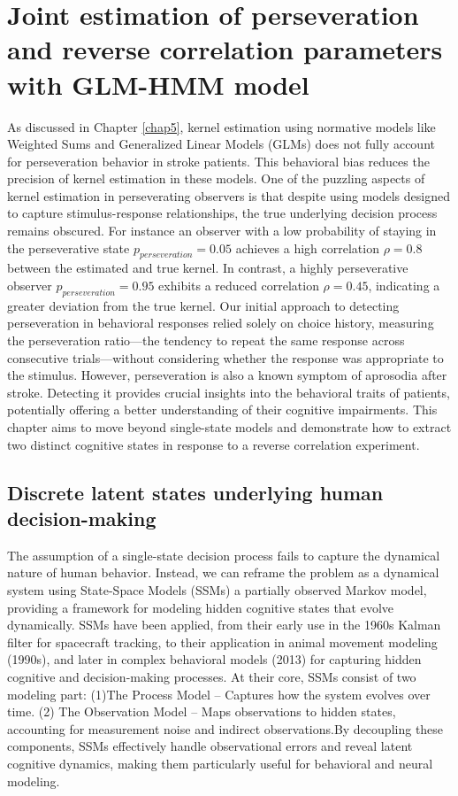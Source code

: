 \renewcommand{\chaptername}{Chapter} 
\chapter{Joint estimation of perseveration and reverse correlation parameters with GLM-HMM model}\label{chap7}
As discussed in Chapter \ref{chap5}, kernel estimation using normative models like Weighted Sums and Generalized Linear Models (GLMs) does not fully account for perseveration behavior in stroke patients. This behavioral bias reduces the precision of kernel estimation in these models. 
One of the puzzling aspects of kernel estimation in perseverating observers is that despite using models designed to capture stimulus-response relationships, the true underlying decision process remains obscured. For instance  an observer with a low probability of staying in the perseverative state $p_{perseveration}=0.05$ achieves a high correlation $\rho=0.8$ between the estimated and true kernel. In contrast, a highly perseverative observer $p_{perseveration}=0.95$ exhibits a reduced correlation $\rho=0.45$, indicating a greater deviation from the true kernel.
Our initial approach to detecting perseveration in behavioral responses relied solely on choice history, measuring the perseveration ratio—the tendency to repeat the same response across consecutive trials—without considering whether the response was appropriate to the stimulus. However, perseveration is also a known symptom of aprosodia after stroke. Detecting it provides crucial insights into the behavioral traits of patients, potentially offering a better understanding of their cognitive impairments. This chapter aims to move beyond single-state models and demonstrate how to extract two distinct cognitive states in response to a reverse correlation experiment.


\section {Discrete latent states underlying human decision-making}
The assumption of a single-state decision process fails to capture the dynamical nature of human behavior. Instead, we can reframe the problem as a dynamical system using State-Space Models (SSMs) a partially observed Markov model, providing a framework for modeling hidden cognitive states that evolve dynamically. SSMs have been applied, from their early use in the 1960s Kalman filter for spacecraft tracking, to their application in animal movement modeling (1990s), and later in complex behavioral models (2013) for capturing hidden cognitive and decision-making processes.
At their core, SSMs consist of two modeling part: (1)The Process Model – Captures how the system evolves over time.  (2) The Observation Model – Maps observations to hidden states, accounting for measurement noise and indirect observations.By decoupling these components, SSMs effectively handle observational errors and reveal latent cognitive dynamics, making them particularly useful for behavioral and neural modeling.

